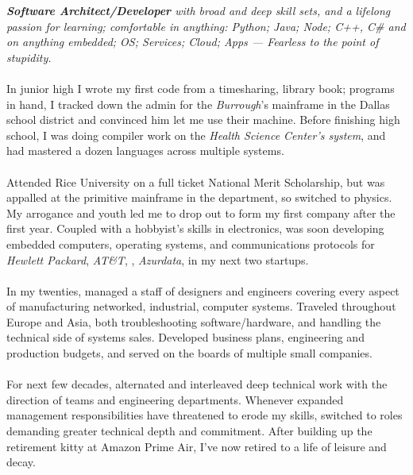 \documentclass[10pt,letterpaper]{article}
\begin{document}
\vspace{-1.3em}  %
\begin{multicols}{2}  %
\noindent \emph{\textbf{Software Architect/Developer} with broad and deep skill sets, and a lifelong passion for learning; comfortable in anything: Python; Java; Node; C++, C\# and on anything embedded; OS; Services; Cloud; Apps --- Fearless to the point of stupidity.}
\\
\\
In junior high I wrote my first code from a \textit{} timesharing, library book; programs in hand, I tracked down the admin for the \textit{Burrough}'s mainframe in the Dallas school district and convinced him let me use their machine. Before finishing high school, I was doing compiler work on the \textit{ Health Science Center's system}, and had mastered a dozen languages across multiple systems.
\\
\\
Attended Rice University on a full ticket National Merit Scholarship, but was appalled at the primitive  mainframe in the  department, so switched to physics. My arrogance and youth led me to drop out to form my first company after the first year. Coupled with a hobbyist's skills in electronics, was soon developing embedded computers, operating systems, and communications protocols for \textit{Hewlett Packard}, \textit{AT\&T}, \textit{}, \textit{Azurdata}, in my next two startups.
\\
\\
In my twenties, managed a staff of designers and engineers covering every aspect of manufacturing networked, industrial, computer systems. Traveled throughout Europe and Asia, both troubleshooting software/hardware, and handling the technical side of systems sales. Developed business plans, engineering and production budgets, and served on the boards of multiple small companies.
\\
\\
For next few decades, alternated and interleaved deep technical work with the direction of teams and engineering departments. Whenever expanded management responsibilities have threatened to erode my skills, switched to roles demanding greater technical depth and commitment. After building up the retirement kitty at Amazon Prime Air, I've now retired to a life of leisure and decay.
\end{multicols}


\spacedhrule{0em}{-0.4em}
\end{document}
